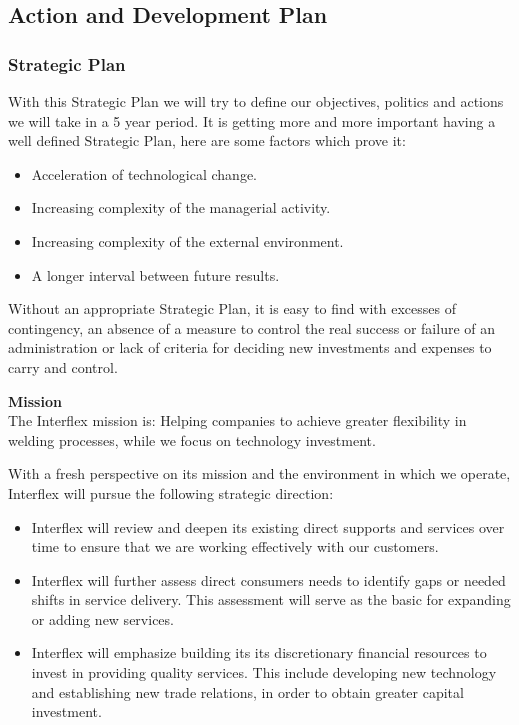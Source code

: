\subsection{Action and Development Plan}
\subsubsection{Strategic Plan}

With this Strategic Plan we will try to define our objectives, politics and actions we will take in a 5 year period. 
It is getting more and more important having a well defined Strategic Plan, here are some factors which prove it:
\begin{itemize}
\item Acceleration of technological change.
\item Increasing complexity of the managerial activity.
\item Increasing complexity of the external environment.
\item A longer interval between future results.
\end{itemize}

Without an appropriate Strategic Plan, it is easy to find with excesses of contingency, an absence of a measure to control the real success or failure of an administration or lack of criteria for deciding new investments and expenses to carry and control.

\textbf{Mission}\\
The Interflex mission is:
Helping companies to achieve greater flexibility in welding processes, while we focus on technology investment.

With a fresh perspective on its mission and the environment in which we operate, Interflex will pursue the following strategic direction:
\begin{itemize}
\item Interflex will review and deepen its existing direct supports and services over time to ensure that we are working effectively with our customers.
\item Interflex will further assess direct consumers needs to identify gaps or needed shifts in service delivery. This assessment will serve as the basic for expanding or adding new services.
\item Interflex will emphasize building its its discretionary financial resources to invest in providing quality services. 
      This include developing new technology and establishing new trade relations, in order to obtain greater capital investment.
\end{itemize}


